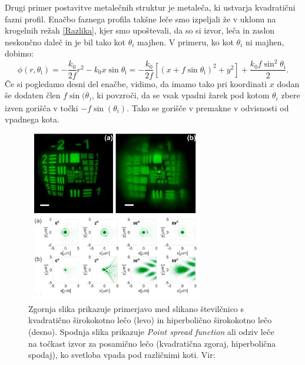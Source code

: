 \documentclass[12pt ]{article}
\begin{document}
Drugi primer postavitve metalečnih struktur je metaleča, ki ustvarja kvadratični fazni profil. Enačbo faznega profila takšne leče smo izpeljali že v uklonu na krogelnih režah \eqref{Razlika}, kjer smo upoštevali, da so si izvor, leča in zaslon neskončno daleč in je bil tako kot $\theta_i$ majhen. V primeru, ko kot $\theta_i$ ni majhen, dobimo:
 \begin{equation}
    \phi\left(r, \theta_{\mathrm{i}}\right)=-\frac{k_{0}}{2 f} r^{2}-k_{0} x \sin \theta_{\mathrm{i}}=-\frac{k_{0}}{2 f}\left[\left(x+f \sin \theta_{\mathrm{i}}\right)^{2}+y^{2}\right]+\frac{k_{0} f \sin ^{2} \theta_{\mathrm{i}}}{2}.
\label{Kvadratična}
\end{equation}
Če si pogledamo desni del enačbe, vidimo, da imamo tako pri koordinati $x$ dodan še dodaten člen $f\sin(\theta_)$, ki povzroči, da se vsak vpadni žarek pod kotom $\theta_i$ zbere izven gorišča v točki $-f\sin(\theta_i)$. Tako se gorišče v premakne v odvisnosti od vpadnega kota.


  \begin{figure}[H]
     \centering
     \includegraphics[width=8cm, height=7.5cm]{Slike/Fokusiranje.png}
     \caption{Zgornja slika prikazuje primerjavo med slikano številčnico s kvadratično širokokotno lečo (levo) in hiperbolično širokokotno lečo (desno). Spodnja slika prikazuje \textit{Point spread function} ali odziv leče na točkast izvor za posamično lečo (kvadratična zgoraj, hiperbolična spodaj), ko svetloba vpada pod različnimi koti.  Vir: \cite{Fokusiranje} }
     \label{Fokusiranje}
 \end{figure}
\end{document}
